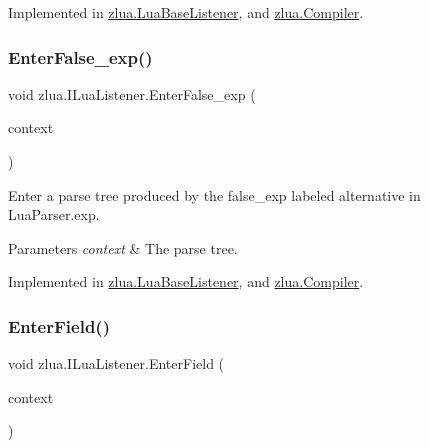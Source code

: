 Implemented in \mbox{\hyperlink{classzlua_1_1_lua_base_listener_a831fc10bcf2d08ebad6ac9768deb4230}{zlua.\+Lua\+Base\+Listener}}, and \mbox{\hyperlink{classzlua_1_1_compiler_a1ae7390644425df6bdefe1b8d7d07ceb}{zlua.\+Compiler}}.

\mbox{\label{interfacezlua_1_1_i_lua_listener_acaeea04a84e6859bedcaa48c486cb640}} 
\subsubsection{\texorpdfstring{Enter\+False\+\_\+exp()}{EnterFalse\_exp()}}
{\footnotesize\ttfamily void zlua.\+I\+Lua\+Listener.\+Enter\+False\+\_\+exp (\begin{DoxyParamCaption}\item[{\mbox{[}\+Not\+Null\mbox{]} \mbox{\hyperlink{classzlua_1_1_lua_parser_1_1_false__exp_context}{Lua\+Parser.\+False\+\_\+exp\+Context}}}]{context }\end{DoxyParamCaption})}



Enter a parse tree produced by the {\ttfamily false\+\_\+exp} labeled alternative in Lua\+Parser.\+exp. 


\begin{DoxyParams}{Parameters}
{\em context} & The parse tree.\\
\hline
\end{DoxyParams}


Implemented in \mbox{\hyperlink{classzlua_1_1_lua_base_listener_a5025dfe7f75ae2d9db0e58eadba0bba0}{zlua.\+Lua\+Base\+Listener}}, and \mbox{\hyperlink{classzlua_1_1_compiler_a2679b9bd28b5726f5b1d45c391d44b1a}{zlua.\+Compiler}}.

\mbox{\label{interfacezlua_1_1_i_lua_listener_abd670dc230362e0d50ad8dfffd50eb61}} 
\subsubsection{\texorpdfstring{Enter\+Field()}{EnterField()}}
{\footnotesize\ttfamily void zlua.\+I\+Lua\+Listener.\+Enter\+Field (\begin{DoxyParamCaption}\item[{\mbox{[}\+Not\+Null\mbox{]} \mbox{\hyperlink{classzlua_1_1_lua_parser_1_1_field_context}{Lua\+Parser.\+Field\+Context}}}]{context }\end{DoxyParamCaption})}



